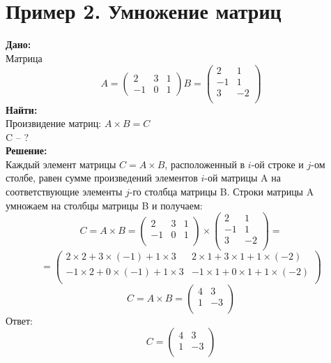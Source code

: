 \documentclass[a4paper,12pt]{article} %
\begin{document}
\section{Пример 2. Умножение матриц}
\textbf{Дано:} \\
Матрица
\begin{displaymath}
A=\begin{pmatrix}
2 & 3 & 1\\
-1 & 0 & 1 
\end{pmatrix}
B=\begin{pmatrix}
2 & 1\\
-1 & 1\\
3 & -2\\
\end{pmatrix}
\end{displaymath}
\textbf{Найти:}\\
Произвидение матриц: $A\times B = C$\\
C -- ?\\
\textbf{Решение:}\\
Каждый элемент матрицы $ C = A \times B$, расположенный в $i$-ой строке и $j$-ом столбе, равен сумме произведений элементов $i$-ой матрицы A на соответствующие элементы $j$-го столбца матрицы B. Строки матрицы A умножаем на столбцы матрицы B и получаем:
\begin{displaymath}
C=A\times B =\begin{pmatrix}
2 & 3 & 1\\
-1 & 0 & 1\\
\end{pmatrix}\times
\begin{pmatrix}
2 & 1\\
-1 & 1\\
3 & -2\\
\end{pmatrix}=
\end{displaymath}
\begin{displaymath}
=\begin{pmatrix}
2\times 2+3\times(-1)+1\times 3 & 2\times 1+3\times 1+1\times (-2)\\
-1\times 2+0\times(-1)+1\times 3 & -1\times 1+0\times 1+1\times (-2)\\
\end{pmatrix}
\end{displaymath}
\begin{displaymath}
C=A\times B =\begin{pmatrix}
4 & 3 \\
1 & -3 \\
\end{pmatrix}
\end{displaymath}
Ответ:\begin{displaymath}
C=\begin{pmatrix}
4 & 3 \\
1 & -3 \\
\end{pmatrix}
\end{displaymath}
\end{document}
